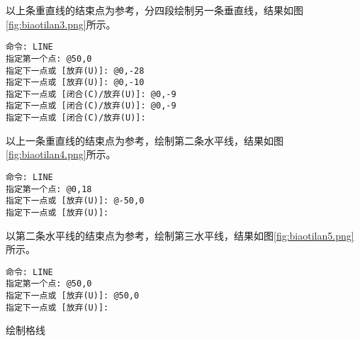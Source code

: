\begin{procedure}
以上条重直线的结束点为参考，分四段绘制另一条垂直线，结果如图\ref{fig:biaotilan3.png}所示。
\begin{lstlisting}
命令: LINE
指定第一个点: @50,0
指定下一点或 [放弃(U)]: @0,-28
指定下一点或 [放弃(U)]: @0,-10
指定下一点或 [闭合(C)/放弃(U)]: @0,-9
指定下一点或 [闭合(C)/放弃(U)]: @0,-9
指定下一点或 [闭合(C)/放弃(U)]:
\end{lstlisting}
以上一条重直线的结束点为参考，绘制第二条水平线，结果如图\ref{fig:biaotilan4.png}所示。
\begin{lstlisting}
命令: LINE
指定第一个点: @0,18
指定下一点或 [放弃(U)]: @-50,0
指定下一点或 [放弃(U)]:
\end{lstlisting}
以第二条水平线的结束点为参考，绘制第三水平线，结果如图\ref{fig:biaotilan5.png}所示。
\begin{lstlisting}
命令: LINE
指定第一个点: @50,0
指定下一点或 [放弃(U)]: @50,0
指定下一点或 [放弃(U)]:
\end{lstlisting}
\item 绘制格线


\end{procedure}
